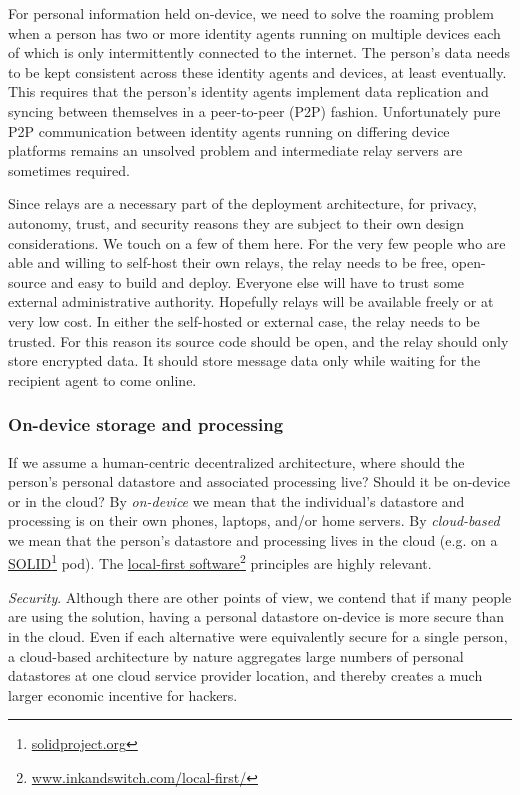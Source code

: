 \documentclass[11pt, oneside]{article}   	%
\newcommand{\hyperfootnote}[1][]{\def\ArgI{{#1}}\hyperfootnoteRelay}
\newcommand\hyperfootnoteRelay[2][]{\href{#1#2}{\ArgI}\footnote{\href{#1#2}{#2}}}
\begin{document}
For personal information held on-device, we need to solve the roaming problem when a person has two or more identity agents running on multiple devices each of which is only intermittently connected to the internet. The person's data needs to be kept consistent across these identity agents and devices, at least eventually. This requires that the person's identity agents implement data replication and syncing between themselves in a peer-to-peer (P2P) fashion. Unfortunately pure P2P communication between identity agents running on differing device platforms remains an unsolved problem and intermediate relay servers are sometimes required. 

Since relays are a necessary part of the deployment architecture, for privacy, autonomy, trust, and security reasons they are subject to their own design considerations. We touch on a few of them here. For the very few people who are able and willing to self-host their own relays, the relay needs to be free, open-source and easy to build and deploy. Everyone else will have to trust some external administrative authority. Hopefully relays will be available freely or at very low cost. In either the self-hosted or external case, the relay needs to be trusted. For this reason its source code should be open, and the relay should only store encrypted data. It should store message data only while waiting for the recipient agent to come online.


\subsubsection{On-device storage and processing}
If we assume a human-centric decentralized architecture, where should the person's personal datastore and associated processing live? Should it be on-device or in the cloud? By \emph{on-device} we mean that the individual's datastore and processing is on their own phones, laptops, and/or home servers. By \emph{cloud-based} we mean that the person's datastore and processing lives in the cloud (e.g. on a \hyperfootnote[SOLID][https://]{solidproject.org} pod). The \hyperfootnote[local-first software][https://]{www.inkandswitch.com/local-first/} principles are highly relevant.

\emph{Security}. Although there are other points of view, we contend that if many people are using the solution, having a personal datastore on-device is more secure than in the cloud. Even if each alternative were equivalently secure for a single person, a cloud-based architecture by nature aggregates large numbers of personal datastores at one cloud service provider location, and thereby creates a much larger economic incentive for hackers. 
\end{document}
